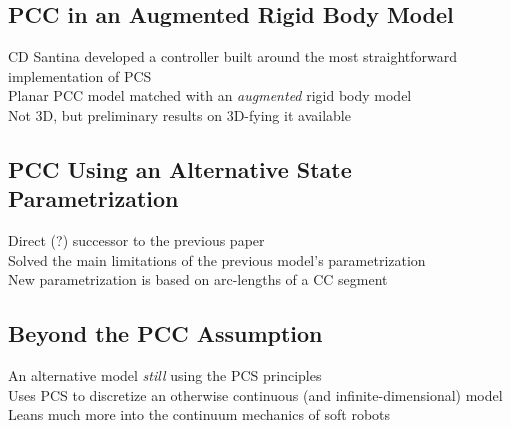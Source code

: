 \subsection{PCC in an Augmented Rigid Body Model}
CD Santina developed a controller built around the most straightforward implementation of PCS \cite{della_santina_model-based_2020}\\
Planar PCC model matched with an \textit{augmented} rigid body model \cite{katzschmann_dynamic_2019}\\
Not 3D, but preliminary results on 3D-fying it available\\
\subsection{PCC Using an Alternative State Parametrization}
Direct (?) successor to the previous paper \cite{della_santina_improved_2020}\\
Solved the main limitations of the previous model's parametrization\\
New parametrization is based on arc-lengths of a CC segment\\
\subsection{Beyond the PCC Assumption}
An alternative model \textit{still} using the PCS principles \cite{renda_discrete_2018}\\
Uses PCS to discretize an otherwise continuous (and infinite-dimensional) model\\
Leans much more into the continuum mechanics of soft robots